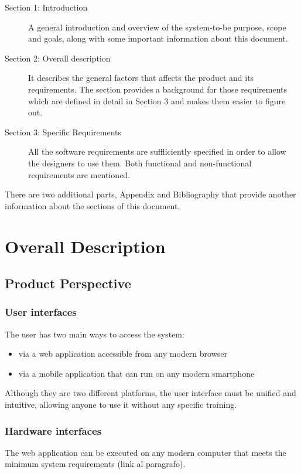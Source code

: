 \documentclass{article}
\begin{document}
	\begin{description}
		\item[Section 1: Introduction] A general introduction and overview of the system-to-be purpose, scope and goals, along with some important information about this document.
		\item[Section 2: Overall description] It describes the general factors that affects the product and its requirements. The section provides a background for those requirements which are defined in detail in Section 3 and makes them easier to figure out.
		\item[Section 3: Specific Requirements] All the software requirements are suffliciently specified in order to allow the designers to use them. Both functional and non-functional requirements are mentioned.
	\end{description}
	
	\bigskip
	There are two additional parts, Appendix and Bibliography that provide another information about the sections of this document.
	
	\section{Overall Description}	
	
	
	\subsection{Product Perspective}
	
	
	\subsubsection{User interfaces}
	The user has two main ways to access the system:
	\begin{itemize}
		\item via a web application accessible from any modern browser
		\item via a mobile application that can run on any modern smartphone
	\end{itemize}
	Although they are two different platforms, the user interface must be unified and intuitive, allowing anyone to use it without any specific training.


	\subsubsection{Hardware interfaces}
	The web application can be executed on any modern computer that meets the minimum system requirements (link al paragrafo).
	
\end{document}
